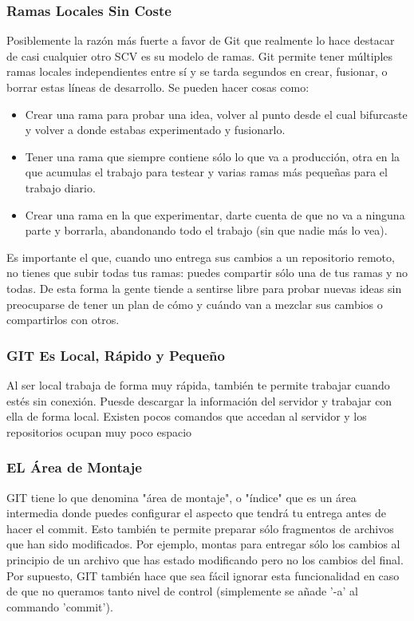 \subsubsection{Ramas Locales Sin Coste}
Posiblemente la razón más fuerte a favor de Git que realmente lo hace destacar de casi cualquier otro SCV es su modelo de ramas. Git permite
tener múltiples ramas locales independientes entre sí y se tarda segundos en crear, fusionar, o borrar estas líneas de desarrollo.
Se pueden hacer cosas como: 
\begin{itemize}
\item Crear una rama para probar una idea, volver al punto desde el cual bifurcaste y volver a donde estabas experimentado y fusionarlo. 
\item Tener una rama que siempre contiene sólo lo que va a producción, otra en la que acumulas el trabajo para testear y varias ramas más pequeñas para el trabajo diario.
\item Crear una rama en la que experimentar, darte cuenta de que no va a ninguna parte y borrarla, abandonando todo el trabajo (sin que nadie más lo vea). 
\end{itemize} 
Es importante el que, cuando uno entrega sus cambios a un repositorio remoto, no tienes que subir todas tus ramas: puedes compartir 
sólo una de tus ramas y no todas. De esta forma la gente tiende a sentirse libre para probar nuevas ideas sin preocuparse de tener un 
plan de cómo y cuándo van a mezclar sus cambios o compartirlos con otros.

\subsubsection{GIT Es Local, Rápido y Pequeño}
Al ser local trabaja de forma muy rápida, también te permite trabajar cuando estés sin conexión. Puesde descargar la información del servidor y
trabajar con ella de forma local. Existen pocos comandos que accedan al servidor y los repositorios ocupan muy poco espacio

\subsubsection{EL Área de Montaje}
GIT tiene lo que denomina "área de montaje", o "índice" que es un área intermedia donde puedes configurar el aspecto 
que tendrá tu entrega antes de hacer el commit. Esto también te permite preparar sólo fragmentos de archivos que han sido modificados. Por ejemplo, montas para entregar sólo los cambios 
al principio de un archivo que has estado modificando pero no los cambios del final. Por supuesto, GIT también hace que sea fácil ignorar esta 
funcionalidad en caso de que no queramos tanto nivel de control (simplemente se añade '-a' al commando 'commit'). 


